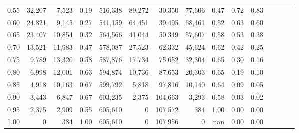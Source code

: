 \begin{tabular}{rrrcrrrrrrrrrrr}
0.55 &  32,207 &   7,523 &                                       0.19 &  516,338 &   89,272 &   30,350 &   77,606 &  0.47 &  0.72 &                         0.83 \\
0.60 &  24,821 &   9,145 &                                       0.27 &  541,159 &   64,451 &   39,495 &   68,461 &  0.52 &  0.63 &                         0.60 \\
0.65 &  23,407 &  10,854 &                                       0.32 &  564,566 &   41,044 &   50,349 &   57,607 &  0.58 &  0.53 &                         0.38 \\
0.70 &  13,521 &  11,983 &                                       0.47 &  578,087 &   27,523 &   62,332 &   45,624 &  0.62 &  0.42 &                         0.25 \\
0.75 &   9,789 &  13,320 &                                       0.58 &  587,876 &   17,734 &   75,652 &   32,304 &  0.65 &  0.30 &                         0.16 \\
0.80 &   6,998 &  12,001 &                                       0.63 &  594,874 &   10,736 &   87,653 &   20,303 &  0.65 &  0.19 &                         0.10 \\
0.85 &   4,918 &  10,163 &                                       0.67 &  599,792 &    5,818 &   97,816 &   10,140 &  0.64 &  0.09 &                         0.05 \\
0.90 &   3,443 &   6,847 &                                       0.67 &  603,235 &    2,375 &  104,663 &    3,293 &  0.58 &  0.03 &                         0.02 \\
0.95 &   2,375 &   2,909 &                                       0.55 &  605,610 &        0 &  107,572 &      384 &  1.00 &  0.00 &                         0.00 \\
1.00 &       0 &     384 &                                       1.00 &  605,610 &        0 &  107,956 &        0 &   nan &  0.00 &                         0.00 \\
\bottomrule
\end{tabular}
